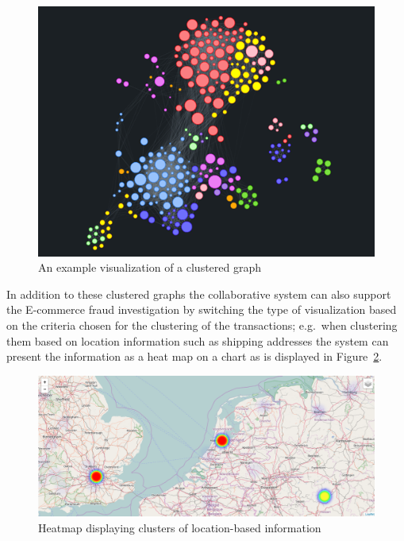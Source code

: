 \begin{figure}[!ht]
  \centering
  \includegraphics[width=0.9\columnwidth]{images/GraphViz.png}
  \caption[An example visualization of a clustered graph]{An example visualization of a clustered graph \citep{visjsshowcase}}
\label{fig:images_graph_viz}
\end{figure}

 In addition to these clustered graphs the collaborative system can also support the \gls{E-commerce} fraud investigation by switching the type of visualization  based on the criteria chosen for the clustering of the transactions; e.g.\ when clustering them based on location information such as shipping addresses the system can present the information as a heat map on a chart as is displayed in Figure~\ref{fig:images_map_heatmap}. \\

\begin{figure}[!ht]
  \centering
  \includegraphics[width=0.9\columnwidth]{images/Heatmap.png}
  \caption{Heatmap displaying clusters of location-based information}
\label{fig:images_map_heatmap}
\end{figure}

